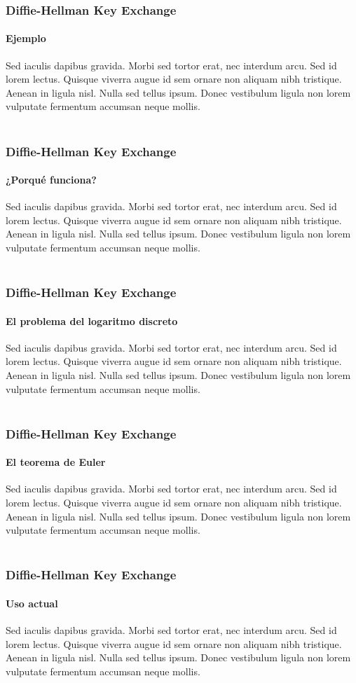 \documentclass[spanish, mexico]{beamer}
\begin{document}
	\begin{frame}
		\frametitle{Diffie-Hellman Key Exchange}
		\framesubtitle{Ejemplo}
		Sed iaculis dapibus gravida. Morbi sed tortor erat, nec interdum arcu. Sed id lorem lectus. Quisque viverra augue id sem ornare non aliquam nibh tristique. Aenean in ligula nisl. Nulla sed tellus ipsum. Donec vestibulum ligula non lorem vulputate fermentum accumsan neque mollis.\\~\\
	\end{frame}

	\begin{frame}
		\frametitle{Diffie-Hellman Key Exchange}
		\framesubtitle{¿Porqué funciona?}
		Sed iaculis dapibus gravida. Morbi sed tortor erat, nec interdum arcu. Sed id lorem lectus. Quisque viverra augue id sem ornare non aliquam nibh tristique. Aenean in ligula nisl. Nulla sed tellus ipsum. Donec vestibulum ligula non lorem vulputate fermentum accumsan neque mollis.\\~\\
	\end{frame}

	\begin{frame}
		\frametitle{Diffie-Hellman Key Exchange}
		\framesubtitle{El problema del logaritmo discreto}
		Sed iaculis dapibus gravida. Morbi sed tortor erat, nec interdum arcu. Sed id lorem lectus. Quisque viverra augue id sem ornare non aliquam nibh tristique. Aenean in ligula nisl. Nulla sed tellus ipsum. Donec vestibulum ligula non lorem vulputate fermentum accumsan neque mollis.\\~\\
	\end{frame}

	\begin{frame}
		\frametitle{Diffie-Hellman Key Exchange}
		\framesubtitle{El teorema de Euler}
		Sed iaculis dapibus gravida. Morbi sed tortor erat, nec interdum arcu. Sed id lorem lectus. Quisque viverra augue id sem ornare non aliquam nibh tristique. Aenean in ligula nisl. Nulla sed tellus ipsum. Donec vestibulum ligula non lorem vulputate fermentum accumsan neque mollis.\\~\\
	\end{frame}

	\begin{frame}
		\frametitle{Diffie-Hellman Key Exchange}
		\framesubtitle{Uso actual}
		Sed iaculis dapibus gravida. Morbi sed tortor erat, nec interdum arcu. Sed id lorem lectus. Quisque viverra augue id sem ornare non aliquam nibh tristique. Aenean in ligula nisl. Nulla sed tellus ipsum. Donec vestibulum ligula non lorem vulputate fermentum accumsan neque mollis.\\~\\
	\end{frame}
\end{document}

